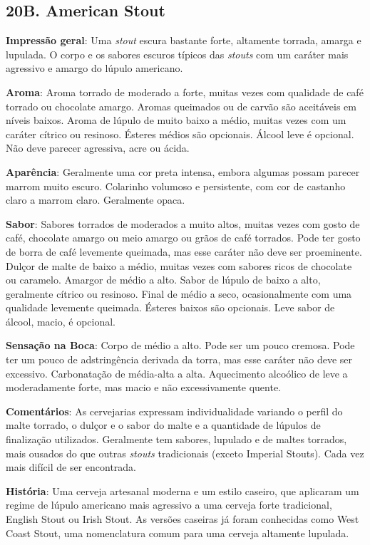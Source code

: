 \subsection*{20B. American Stout}
\textbf{Impressão geral}: Uma \textit{stout} escura bastante forte, altamente torrada, amarga e lupulada. O corpo e os sabores escuros típicos das \textit{stouts} com um caráter mais agressivo e amargo do lúpulo americano.

\textbf{Aroma}: Aroma torrado de moderado a forte, muitas vezes com qualidade de café torrado ou chocolate amargo. Aromas queimados ou de carvão são aceitáveis em níveis baixos. Aroma de lúpulo de muito baixo a médio, muitas vezes com um caráter cítrico ou resinoso. Ésteres médios são opcionais. Álcool leve é opcional. Não deve parecer agressiva, acre ou ácida.

\textbf{Aparência}: Geralmente uma cor preta intensa, embora algumas possam parecer marrom muito escuro. Colarinho volumoso e persistente, com cor de castanho claro a marrom claro. Geralmente opaca.

\textbf{Sabor}: Sabores torrados de moderados a muito altos, muitas vezes com gosto de café, chocolate amargo ou meio amargo ou grãos de café torrados. Pode ter gosto de borra de café levemente queimada, mas esse caráter não deve ser proeminente. Dulçor de malte de baixo a médio, muitas vezes com sabores ricos de chocolate ou caramelo. Amargor de médio a alto. Sabor de lúpulo de baixo a alto, geralmente cítrico ou resinoso. Final de médio a seco, ocasionalmente com uma qualidade levemente queimada. Ésteres baixos são opcionais. Leve sabor de álcool, macio, é opcional.

\textbf{Sensação na Boca}: Corpo de médio a alto. Pode ser um pouco cremosa. Pode ter um pouco de adstringência derivada da torra, mas esse caráter não deve ser excessivo. Carbonatação de média-alta a alta. Aquecimento alcoólico de leve a moderadamente forte, mas macio e não excessivamente quente.

\textbf{Comentários}: As cervejarias expressam individualidade variando o perfil do malte torrado, o dulçor e o sabor do malte e a quantidade de lúpulos de finalização utilizados. Geralmente tem sabores, lupulado e de maltes torrados, mais ousados do que outras \textit{stouts} tradicionais (exceto Imperial Stouts). Cada vez mais difícil de ser encontrada.

\textbf{História}: Uma cerveja artesanal moderna e um estilo caseiro, que aplicaram um regime de lúpulo americano mais agressivo a uma cerveja forte tradicional, English Stout ou Irish Stout. As versões caseiras já foram conhecidas como West Coast Stout, uma nomenclatura comum para uma cerveja altamente lupulada.

